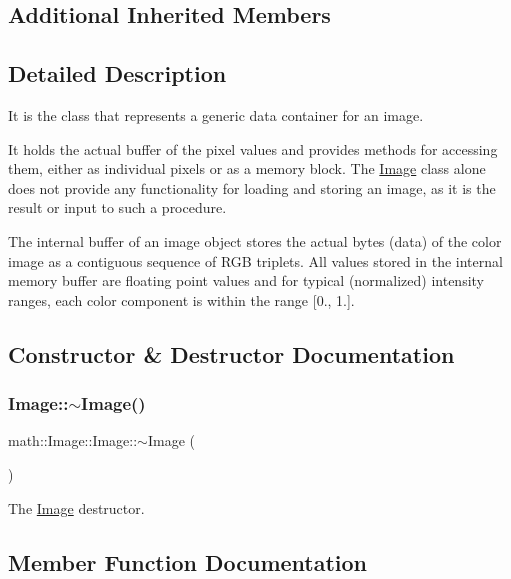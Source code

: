 \subsection*{Additional Inherited Members}


\subsection{Detailed Description}
It is the class that represents a generic data container for an image.

It holds the actual buffer of the pixel values and provides methods for accessing them, either as individual pixels or as a memory block. The \hyperlink{classmath_1_1_image}{Image} class alone does not provide any functionality for loading and storing an image, as it is the result or input to such a procedure.

The internal buffer of an image object stores the actual bytes (data) of the color image as a contiguous sequence of R\+GB triplets. All values stored in the internal memory buffer are floating point values and for typical (normalized) intensity ranges, each color component is within the range \mbox{[}0., 1.\mbox{]}. 

\subsection{Constructor \& Destructor Documentation}
\mbox{\label{classmath_1_1_image_a584aa9f6d6f9bd80e94c773402bcf5e2}} 
\subsubsection{\texorpdfstring{Image\+::$\sim$\+Image()}{Image::~Image()}}
{\footnotesize\ttfamily math\+::\+Image\+::\+Image\+::$\sim$\+Image (\begin{DoxyParamCaption}{ }\end{DoxyParamCaption})}

The \hyperlink{classmath_1_1_image}{Image} destructor. 

\subsection{Member Function Documentation}
\mbox{\label{classmath_1_1_image_ac3df85cc8f60c6f0b2d3de123fa9cf96}} 
